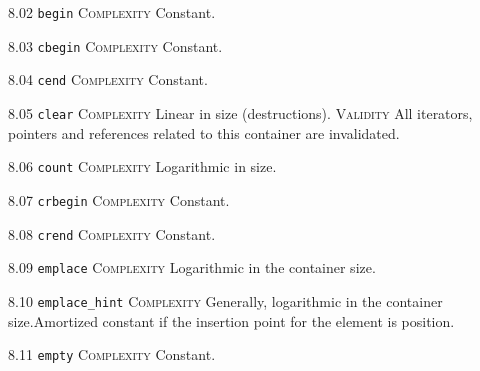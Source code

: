 \noindent\textcolor{cgreen}{8.02 \texttt{begin}} \textsc{Complexity} Constant. \vspace{0.5em}

\noindent\textcolor{cgreen}{8.03 \texttt{cbegin}} \textsc{Complexity} Constant. \vspace{0.5em}

\noindent\textcolor{cgreen}{8.04 \texttt{cend}} \textsc{Complexity} Constant. \vspace{0.5em}

\noindent\textcolor{corange}{8.05 \texttt{clear}} \textsc{Complexity} Linear in size (destructions). \textsc{Validity} All iterators, pointers and references related to this container are invalidated.\vspace{0.5em}

\noindent\textcolor{clime}{8.06 \texttt{count}} \textsc{Complexity} Logarithmic in size. \vspace{0.5em}

\noindent\textcolor{cgreen}{8.07 \texttt{crbegin}} \textsc{Complexity} Constant. \vspace{0.5em}

\noindent\textcolor{cgreen}{8.08 \texttt{crend}} \textsc{Complexity} Constant. \vspace{0.5em}

\noindent\textcolor{clime}{8.09 \texttt{emplace}} \textsc{Complexity} Logarithmic in the container size. \vspace{0.5em}

\noindent\textcolor{clime}{8.10 \texttt{emplace\_hint}} \textsc{Complexity} Generally, logarithmic in the container size.Amortized constant if the insertion point for the element is position. \vspace{0.5em}

\noindent\textcolor{cgreen}{8.11 \texttt{empty}} \textsc{Complexity} Constant. \vspace{0.5em}

